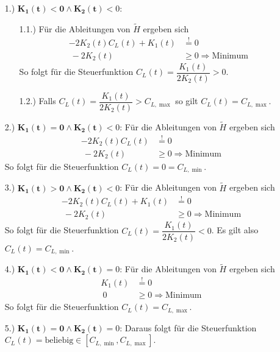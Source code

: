 \begin{enumerate}
\begin{enumerate}
        \item[1.)] $\mathbf{K_1(t) < 0 \wedge K_2(t)} < 0$:
        \begin{enumerate}
            \item[1.1.)] Für die Ableitungen von $\tilde{H}$ ergeben sich
            \[\begin{split}
            - 2 K_2(t) C_L(t) + K_1(t) &\stackrel{!}{=} 0 \\\
            - 2 K_2(t) &\geq 0 \Rightarrow \text{Minimum}
            \end{split}\]
            So folgt für die Steuerfunktion $C_L(t) = \dfrac{K_1(t)}{2 K_2(t)} > 0$.
            \item[1.2.)] Falls $C_L(t) = \dfrac{K_1(t)}{2 K_2(t)} > C_{L, \max}$ so gilt  $C_L(t) = C_{L, \max}$.
        \end{enumerate}
        \item[2.)] $\mathbf{K_1(t) = 0 \wedge K_2(t)} < 0$: Für die Ableitungen von $\tilde{H}$ ergeben sich
        \[\begin{split}
        - 2 K_2(t) C_L(t) &\stackrel{!}{=} 0 \\\
        - 2 K_2(t) &\geq 0 \Rightarrow \text{Minimum}
        \end{split}\]
        So folgt für die Steuerfunktion $C_L(t) = 0 = C_{L, \min}$.
        \item[3.)] $\mathbf{K_1(t) > 0 \wedge K_2(t)} < 0$: Für die Ableitungen von $\tilde{H}$ ergeben sich
        \[\begin{split}
        - 2 K_2(t) C_L(t) + K_1(t) &\stackrel{!}{=} 0 \\\
        - 2 K_2(t) &\geq 0 \Rightarrow \text{Minimum}
        \end{split}\]
        So folgt für die Steuerfunktion $C_L(t) = \dfrac{K_1(t)}{2 K_2(t)} < 0$. Es gilt also $C_L(t) = C_{L, \min}$.
        \item[4.)] $\mathbf{K_1(t) < 0 \wedge K_2(t)} = 0$: Für die Ableitungen von $\tilde{H}$ ergeben sich
        \[\begin{split}
        K_1(t) &\stackrel{!}{=} 0 \\\
        0 &\geq 0 \Rightarrow \text{Minimum}
        \end{split}\]
        So folgt für die Steuerfunktion $C_L(t) = C_{L, \max}$.
        \item[5.)] $\mathbf{K_1(t) = 0 \wedge K_2(t)} = 0$: Daraus folgt für die Steuerfunktion $C_L(t) = \text{beliebig} \in [C_{L, \min},C_{L, \max}]$.

\end{enumerate}
\end{enumerate}

